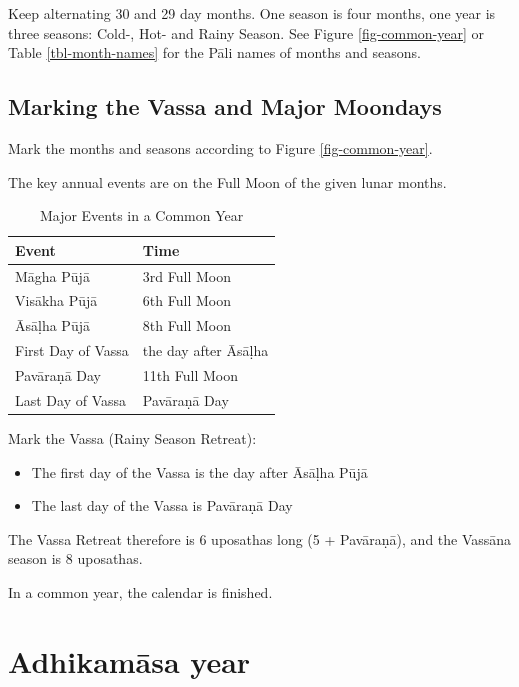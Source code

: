 \documentclass[11pt,oneside]{memoir-article}
\begin{document}
Keep alternating 30 and 29 day months. One season is four months, one year is
three seasons: Cold-, Hot- and Rainy Season. See Figure \ref{fig-common-year} or
Table \ref{tbl-month-names} for the Pāli names of months and seasons.

\subsection{Marking the Vassa and Major Moondays}
\label{sec-2-2-2}
\label{marking-the-moondays-common-year}

Mark the months and seasons according to Figure \ref{fig-common-year}.

The key annual events are on the Full Moon of the given lunar months.

\begin{table}[h]
\caption{\label{tbl-major-events} Major Events in a Common Year}
\centering
\begin{tabular}{ll}
Event & Time\\
\hline
Māgha Pūjā & 3rd Full Moon\\
Visākha Pūjā & 6th Full Moon\\
Āsāḷha Pūjā & 8th Full Moon\\
First Day of Vassa & the day after Āsāḷha\\
Pavāraṇā Day & 11th Full Moon\\
Last Day of Vassa & Pavāraṇā Day\\
\end{tabular}
\end{table}

Mark the Vassa (Rainy Season Retreat):

\begin{itemize}
\item The first day of the Vassa is the day after Āsāḷha Pūjā
\item The last day of the Vassa is Pavāraṇā Day
\end{itemize}

\enlargethispage{2\baselineskip}

The Vassa Retreat therefore is 6 uposathas long (5 + Pavāraṇā), and the Vassāna
season is 8 uposathas.

In a common year, the calendar is finished. 

\clearpage

\section{Adhikamāsa year}
\label{sec-2-3}
\end{document}
